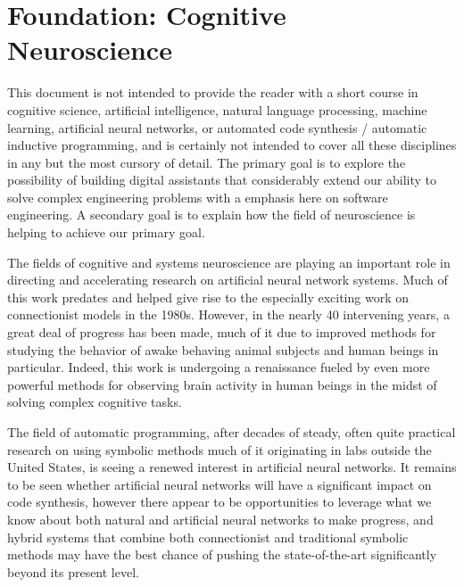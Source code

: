 
\section{Foundation: Cognitive Neuroscience}


This document is not intended to provide the reader with a short course in cognitive science, artificial intelligence, natural language processing, machine learning, artificial neural networks, or automated code synthesis / automatic inductive programming, and is certainly not intended to cover all these disciplines in any but the most cursory of detail. The primary goal is to explore the possibility of building digital assistants that considerably extend our ability to solve complex engineering problems with a emphasis here on software engineering. A secondary goal is to explain how the field of neuroscience is helping to achieve our primary goal.

The fields of cognitive and systems neuroscience are playing an important role in directing and accelerating research on artificial neural network systems. Much of this work predates and helped give rise to the especially exciting work on connectionist models in the 1980s. However, in the nearly 40 intervening years, a great deal of progress has been made, much of it due to improved methods for studying the behavior of awake behaving animal subjects and human beings in particular. Indeed, this work is undergoing a renaissance fueled by even more powerful methods for observing brain activity in human beings in the midst of solving complex cognitive tasks.

The field of automatic programming, after decades of steady, often quite practical research on using symbolic methods \emdash{} much of it originating in labs outside the United States, is seeing a renewed interest in artificial neural networks. It remains to be seen whether artificial neural networks will have a significant impact on code synthesis, however there appear to be opportunities to leverage what we know about both natural and artificial neural networks to make progress, and hybrid systems that combine both connectionist and traditional symbolic methods may have the best chance of pushing the state-of-the-art significantly beyond its present level.

